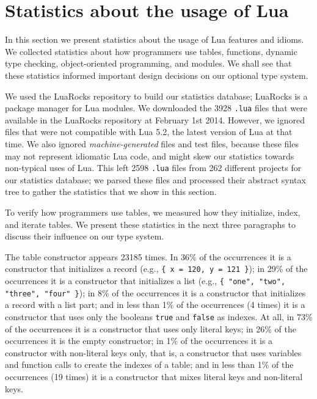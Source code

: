 \section{Statistics about the usage of Lua}
\label{sec:statistics}

In this section we present statistics about the usage of Lua
features and idioms.
We collected statistics about how programmers use tables, functions,
dynamic type checking, object-oriented programming, and modules.
We shall see that these statistics informed important design decisions
on our optional type system.

We used the LuaRocks repository to build our statistics database;
LuaRocks \citep{hisham2013luarocks} is a package manager for Lua
modules.
We downloaded the 3928 \texttt{.lua} files that were available in
the LuaRocks repository at February 1st 2014.
However, we ignored files that were not compatible with Lua 5.2,
the latest version of Lua at that time.
We also ignored \emph{machine-generated} files and test files,
because these files may not represent idiomatic Lua code,
and might skew our statistics towards non-typical uses of Lua.
This left 2598 \texttt{.lua} files from 262 different projects for
our statistics database;
we parsed these files and processed their abstract syntax tree
to gather the statistics that we show in this section.

To verify how programmers use tables, we measured how they
initialize, index, and iterate tables.
We present these statistics in the next three paragraphs to discuss
their influence on our type system.

The table constructor appears 23185 times.
In 36\% of the occurrences it is a constructor that initializes a
record (e.g., \texttt{\{ x = 120, y = 121 \}});
in 29\% of the occurrences it is a constructor that initializes a
list (e.g., \texttt{\{ "one", "two", "three", "four" \}});
in 8\% of the occurrences it is a constructor that initializes a
record with a list part;
and in less than 1\% of the occurrences (4 times) it is a constructor
that uses only the booleans \texttt{true} and \texttt{false} as indexes.
At all, in 73\% of the occurrences it is a constructor that uses
only literal keys;
in 26\% of the occurrences it is the empty constructor;
in 1\% of the occurrences it is a constructor with non-literal keys
only, that is, a constructor that uses variables and function calls
to create the indexes of a table;
and in less than 1\% of the occurrences (19 times) it is a constructor
that mixes literal keys and non-literal keys.

